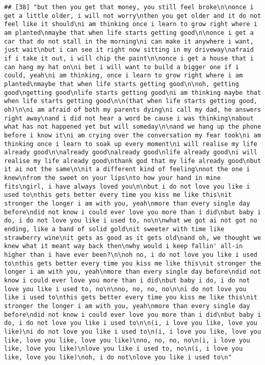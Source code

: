 \documentclass[]{article}
\begin{document}
\begin{verbatim}
## [38] "but then you get that money, you still feel broke\n\nonce i get a little older, i will not worry\nthen you get older and it do not feel like it should\ni am thinking once i learn to grow right where i am planted\nmaybe that when life starts getting good\n\nonce i get a car that do not stall in the morning\ni can make it anywhere i want, just wait\nbut i can see it right now sitting in my driveway\nafraid if i take it out, i will chip the paint\n\nonce i get a house that i can hang my hat on\ni bet i will want to build a bigger one if i could, yeah\ni am thinking, once i learn to grow right where i am planted\nmaybe that when life starts getting good\n\noh, getting good\ngetting good\nlife starts getting good\ni am thinking maybe that when life starts getting good\n\n(that when life starts getting good, oh)\n\ni am afraid of both my parents dying\ni call my dad, he answers right away\nand i did not hear a word be cause i was thinking\nabout what has not happened yet but will someday\n\nand we hang up the phone before i know it\ni am crying over the conversation my fear took\ni am thinking once i learn to soak up every moment\ni will realise my life already good\n\nalready good\nalready good\nlife already good\ni will realise my life already good\nthank god that my life already good\nbut it ai not the same\n\nit a different kind of feeling\nnot the one i knew\nfrom the sweet on your lips\nto how your hand in mine fits\ngirl, i have always loved you\n\nbut i do not love you like i used to\nthis gets better every time you kiss me like this\nit stronger the longer i am with you, yeah\nmore than every single day before\ndid not know i could ever love you more than i did\nbut baby i do, i do not love you like i used to, no\n\nwhat we got ai not got no ending, like a band of solid gold\nit sweeter with time like strawberry wine\nit gets as good as it gets old\nand oh, we thought we knew what it meant way back then\nwhy would i keep fallin' all-in higher than i have ever been?\n\noh no, i do not love you like i used to\nthis gets better every time you kiss me like this\nit stronger the longer i am with you, yeah\nmore than every single day before\ndid not know i could ever love you more than i did\nbut baby i do, i do not love you like i used to, no\n\nno, no, no, no\n\ni do not love you like i used to\nthis gets better every time you kiss me like this\nit stronger the longer i am with you, yeah\nmore than every single day before\ndid not know i could ever love you more than i did\nbut baby i do, i do not love you like i used to\n\n(i, i love you like, love you like)\ni do not love you like i used to\n(i, i love you like, love you like, love you like, love you like)\nno, no, no, no\n(i, i love you like, love you like)\nlove you like i used to, no\n(i, i love you like, love you like)\noh, i do not\nlove you like i used to\n"

\end{verbatim}
\end{document}
